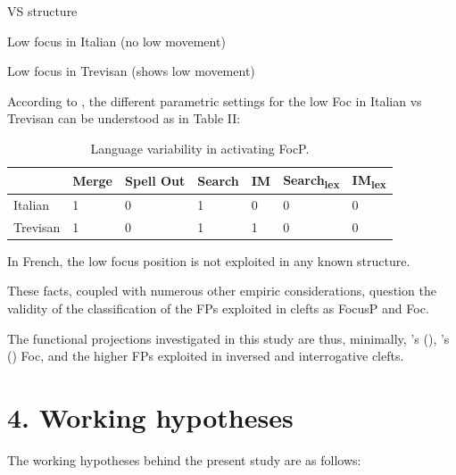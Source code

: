\documentclass[fleqn,10pt]{wlscirep}
\begin{document}
\begin{exe}
    \ex VS structure
\end{exe}

\begin{exe}
    \ex Low focus in Italian (no low movement)
\end{exe}

\begin{exe}
    \ex Low focus in Trevisan (shows low movement)
\end{exe}

According to \citet{bonan22}, the different parametric settings for the low Foc in Italian vs Trevisan can be understood as in Table II:

\begin{table}[ht]
    \centering
    \begin{tabular}{|l|l|l|l|l|l|l|}
    \hline
     & Merge & Spell Out & Search & IM & Search\textsubscript{lex} & IM\textsubscript{lex} \\
    \hline
    Italian & 1 & 0 & 1 & 0 & 0 & 0 \\
    \hline
    Trevisan & 1 & 0 & 1 & 1 & 0 & 0\\
    \hline
    \end{tabular}
    \caption{\label{tab:samp2}Language variability in activating FocP.}
    \end{table}

In French, the low focus position is not exploited in any known structure. 

These facts, coupled with numerous other empiric considerations, question the validity of the classification of the FPs exploited in clefts as FocusP and Foc. 

The functional projections investigated in this study are thus, minimally, \citeauthor{rizzi1997fine}’s (\citeyear{rizzi1997fine}), \citeauthor{belletti2004}’s (\citeyear{belletti2004}) Foc, and the higher FPs exploited in inversed and interrogative clefts.

\begin{exe}
    \ex 
\end{exe}

\section*{4. Working hypotheses}
The working hypotheses behind the present study are as follows:
\end{document}
